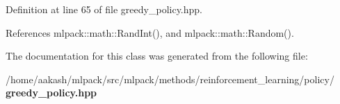 Definition at line 65 of file greedy\+\_\+policy.\+hpp.



References mlpack\+::math\+::\+Rand\+Int(), and mlpack\+::math\+::\+Random().



The documentation for this class was generated from the following file\+:\begin{DoxyCompactItemize}
\item 
/home/aakash/mlpack/src/mlpack/methods/reinforcement\+\_\+learning/policy/\textbf{ greedy\+\_\+policy.\+hpp}\end{DoxyCompactItemize}

